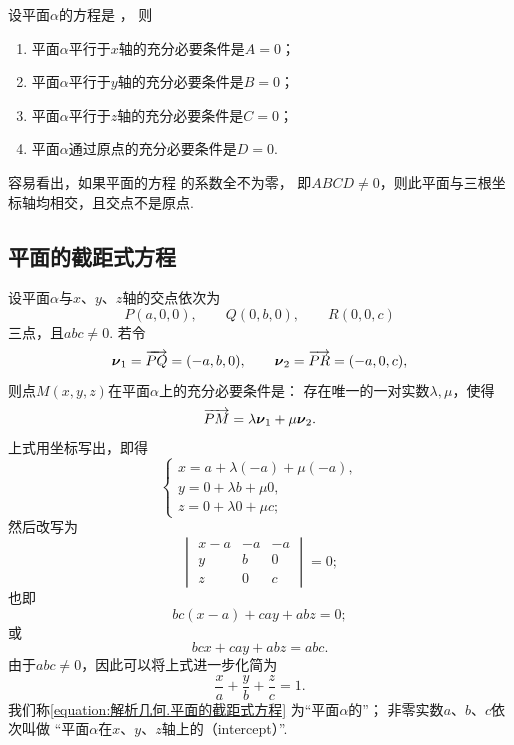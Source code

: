 \begin{corollary}
设平面\(\alpha\)的方程是 ，
则\begin{enumerate}
	\item 平面\(\alpha\)平行于\(x\)轴的充分必要条件是\(A=0\)；
	\item 平面\(\alpha\)平行于\(y\)轴的充分必要条件是\(B=0\)；
	\item 平面\(\alpha\)平行于\(z\)轴的充分必要条件是\(C=0\)；
	\item 平面\(\alpha\)通过原点的充分必要条件是\(D=0\).
\end{enumerate}
\end{corollary}

容易看出，如果平面的方程  的系数全不为零，
即\(ABCD\neq0\)，则此平面与三根坐标轴均相交，且交点不是原点.

\subsection{平面的截距式方程}
设平面\(\alpha\)与\(x\)、\(y\)、\(z\)轴的交点依次为\begin{equation*}
	P(a,0,0), \qquad
	Q(0,b,0), \qquad
	R(0,0,c)
\end{equation*}三点，且\(abc\neq0\).
若令\begin{equation*}
	\boldsymbol{\nu}_1 = \overrightarrow{PQ} = (-a,b,0), \qquad
	\boldsymbol{\nu}_2 = \overrightarrow{PR} = (-a,0,c),
\end{equation*}
则点\(M(x,y,z)\)在平面\(\alpha\)上的充分必要条件是：
存在唯一的一对实数\(\lambda,\mu\)，使得\begin{equation*}
	\overrightarrow{PM} = \lambda \boldsymbol{\nu}_1 + \mu \boldsymbol{\nu}_2.
\end{equation*}
上式用坐标写出，即得\begin{equation*}
	\left\{ \begin{array}{l}
		x = a + \lambda (-a) + \mu(-a), \\
		y = 0 + \lambda b + \mu 0, \\
		z = 0 + \lambda 0 + \mu c;
	\end{array} \right.
\end{equation*}然后改写为\begin{equation*}
	\begin{vmatrix}
		x-a & -a & -a \\
		y & b & 0 \\
		z & 0 & c
	\end{vmatrix} = 0;
\end{equation*}也即\begin{equation*}
	bc (x-a) + ca y + ab z = 0;
\end{equation*}或\begin{equation*}
	bc x + ca y + ab z = abc.
\end{equation*}
由于\(abc\neq0\)，因此可以将上式进一步化简为
\begin{equation}\label{equation:解析几何.平面的截距式方程}
	\frac{x}{a} + \frac{y}{b} + \frac{z}{c} = 1.
\end{equation}
我们称\cref{equation:解析几何.平面的截距式方程}
为“平面\(\alpha\)的”；
非零实数\(a\)、\(b\)、\(c\)依次叫做
“平面\(\alpha\)在\(x\)、\(y\)、\(z\)轴上的（intercept）”.

